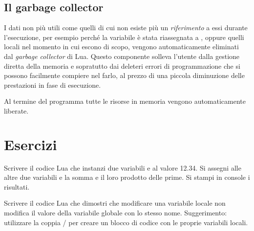 \subsection{Il garbage collector}

I dati non più utili come quelli di cui non esiste più un \emph{riferimento} a
essi durante l'esecuzione, per esempio perché la variabile è stata riassegnata a
, oppure quelli locali nel momento in cui escono di scopo, vengono
automaticamente eliminati dal \emph{garbage collector} di Lua. Questo componente
solleva l'utente dalla gestione diretta della memoria e sopratutto dai deleteri
errori di programmazione che si possono facilmente compiere nel farlo, al prezzo
di una piccola diminuzione delle prestazioni in fase di esecuzione.

Al termine del programma tutte le risorse in memoria vengono automaticamente
liberate.

\section{Esercizi}

\begin{Exercise}[label=fond-01]
Scrivere il codice Lua che instanzi due variabili  e  al valore
12.34. Si assegni alle altre due variabili  e  la somma e il
loro prodotto delle prime. Si stampi in console i risultati.
\end{Exercise}

\begin{Exercise}[label=fond-02]
Scrivere il codice Lua che dimostri che modificare una variabile locale non
modifica il valore della variabile globale con lo stesso nome. Suggerimento:
utilizzare la coppia / per creare un blocco di codice con le
proprie variabili locali.
\end{Exercise}

